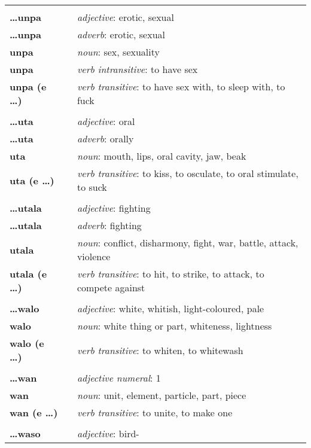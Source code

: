 \begin{supertabular}{p{2,5cm}|ll}
 && \\ %
\textbf{\dots unpa} && \textit{adjective}: erotic, sexual \\ 
\textbf{\dots unpa} && \textit{adverb}: erotic, sexual \\ 
\textbf{unpa} && \textit{noun}: sex, sexuality \\ 
\textbf{unpa} && \textit{verb intransitive}: to have sex \\ 
\textbf{unpa (e \dots)} && \textit{verb transitive}: to have sex with, to sleep with, to fuck \\ 
 && \\ %
\textbf{\dots uta} && \textit{adjective}: oral \\ 
\textbf{\dots uta} && \textit{adverb}: orally \\ 
\textbf{uta} && \textit{noun}: mouth, lips, oral cavity, jaw, beak \\ 
\textbf{uta (e \dots)} && \textit{verb transitive}: to kiss, to osculate, to oral stimulate, to suck \\ 
 && \\ %
\textbf{\dots utala} && \textit{adjective}: fighting \\ 
\textbf{\dots utala} && \textit{adverb}: fighting \\ 
\textbf{utala} && \textit{noun}: conflict, disharmony, fight, war, battle, attack, violence \\ 
\textbf{utala (e \dots)} && \textit{verb transitive}: to hit, to strike, to attack, to compete against \\ 
 && \\ %
\textbf{\dots walo} && \textit{adjective}: white, whitish, light-coloured, pale \\ 
\textbf{walo} && \textit{noun}: white thing or part, whiteness, lightness \\ 
\textbf{walo (e \dots)} && \textit{verb transitive}: to whiten, to whitewash \\ 
 && \\ %
\textbf{\dots wan} && \textit{adjective numeral}: 1 \\ 
\textbf{wan} && \textit{noun}: unit, element, particle, part, piece \\ 
\textbf{wan (e \dots)} && \textit{verb transitive}: to unite, to make one \\ 
 && \\ %
\textbf{\dots waso} && \textit{adjective}: bird- \\ 

\end{supertabular}
